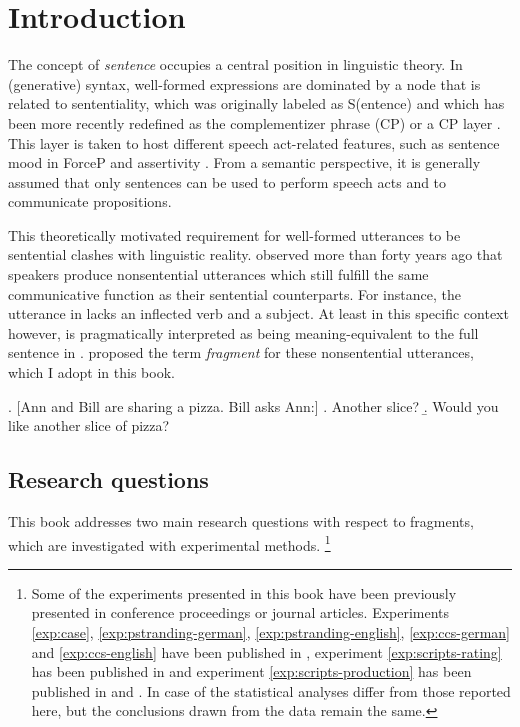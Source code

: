 \chapter{Introduction} \label{sec:intro}

The concept of \textit{sentence} occupies a central position in linguistic theory. In (generative) syntax, well-formed expressions are dominated by a node that is related to sententiality, which was originally labeled as S(entence) \citep[see e.g.][]{chomsky1965} and which has been more recently redefined as the complementizer phrase (CP) or a CP layer \citep{rizzi1997}. This layer is taken to host different speech act-related features, such as sentence mood in  ForceP and assertivity \citep{krifka1995}. From a semantic perspective, it is generally assumed that only sentences can be used to perform speech acts and to communicate propositions.

This theoretically motivated requirement for well-formed utterances to be sentential clashes with linguistic reality. \citet{morgan1973} observed more than forty years ago that speakers produce nonsentential utterances which still fulfill the same communicative function as their sentential counterparts. For instance, the utterance in \Next[a] lacks an inflected verb and a subject. At least in this specific context however, \Next[a] is pragmatically interpreted as being meaning-equivalent to the full sentence in \Next[b]. \citet{morgan1973} proposed the term \textit{fragment} for these nonsentential utterances, which I adopt in this book.

\ex. [Ann and Bill are sharing a pizza. Bill asks Ann:] 
    \a. Another slice? \label{ex:intro-fragment}
     \b. Would you like another slice of pizza?

\section{Research questions}
This book addresses two main research questions with respect to fragments, which are investigated with experimental methods.%
%
\footnote{Some of the experiments presented in this book have been previously presented in conference proceedings or journal articles. Experiments \ref{exp:case}, \ref{exp:pstranding-german}, \ref{exp:pstranding-english}, \ref{exp:ccs-german} and \ref{exp:ccs-english} have been published in \citet{lemke2017}, experiment \ref{exp:scripts-rating} has been published in \citet{lemke.etal2021} and experiment \ref{exp:scripts-production} has been published in \citet{lemke.etal2020} and \citet{lemke.etal2021a}. In case of \citet{lemke2017} the statistical analyses differ from those reported here, but the conclusions drawn from the data remain the same.}\afterfn%
%

